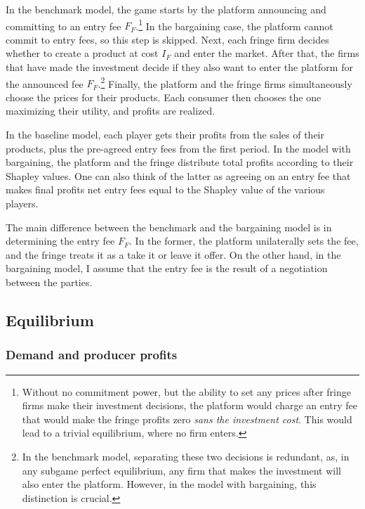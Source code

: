 \documentclass[a4paper]{article}
\begin{document}
In the benchmark model, the game starts by the platform announcing and committing to an entry fee $F_F$.\footnote{
    Without no commitment power, but the ability to set any prices after fringe firms make their investment decisions, the platform would charge an entry fee that would make the fringe profits zero \emph{sans the investment cost}.
    This would lead to a trivial equilibrium, where no firm enters.
}
In the bargaining case, the platform cannot commit to entry fees, so this step is skipped.
Next, each fringe firm decides whether to create a product at cost $I_F$ and enter the market.
After that, the firms that have made the investment decide if they also want to enter the platform for the announced fee $F_F$.\footnote{
    In the benchmark model, separating these two decisions is redundant, as, in any subgame perfect equilibrium, any firm that makes the investment will also enter the platform.
    However, in the model with bargaining, this distinction is crucial.
}
Finally, the platform and the fringe firms simultaneously choose the prices for their products.
Each consumer then chooses the one maximizing their utility, and profits are realized.

In the baseline model, each player gets their profits from the sales of their products, plus the pre-agreed entry fees from the first period.
In the model with bargaining, the platform and the fringe distribute total profits according to their Shapley values.
One can also think of the latter as agreeing on an entry fee that makes final profits net entry fees equal to the Shapley value of the various players.

The main difference between the benchmark and the bargaining model is in determining the entry fee $F_F$.
In the former, the platform unilaterally sets the fee, and the fringe treats it as a take it or leave it offer.
On the other hand, in the bargaining model, I assume that the entry fee is the result of a negotiation between the parties.


\subsection{Equilibrium}

\subsubsection{Demand and producer profits}
\end{document}
